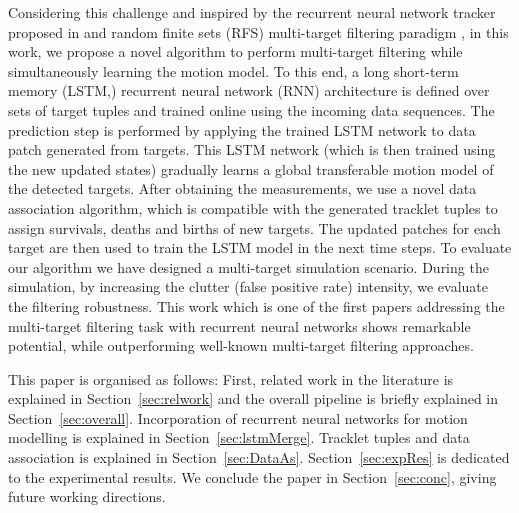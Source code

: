 \documentclass[runningheads]{llncs}
\begin{document}
Considering this challenge and inspired by the recurrent neural network tracker proposed in \cite{Milan:2017} and random finite sets (RFS) multi-target filtering paradigm \cite{Mahler:2003,Mahler:2007,Vo:2006}, in this work, we propose a novel algorithm to perform multi-target filtering while simultaneously learning the motion model. To this end, a long short-term memory (LSTM,{\cite{hochreiter1997}}) recurrent neural network (RNN) architecture is defined over sets of target tuples and trained {online} using the incoming data sequences. The prediction step is performed by applying the trained LSTM network to data patch generated from targets. This LSTM network (which is then trained using the new updated states) gradually learns a global transferable motion model of the detected targets.
After obtaining the measurements, we use a novel data association algorithm, which is compatible with the generated tracklet tuples to assign survivals, deaths and births of new targets. The updated patches for each target are then used to train the LSTM model in the next time steps.
To evaluate our algorithm we have designed a multi-target simulation scenario. During the simulation, by increasing the clutter (false positive rate) intensity, we evaluate the filtering robustness. 
This work which is one of the first papers addressing the multi-target filtering task with recurrent neural networks shows remarkable potential, while outperforming well-known multi-target filtering approaches.

This paper is organised as follows: First, related work in the literature is explained in Section~\ref{sec:relwork} and the overall pipeline is briefly explained in Section~\ref{sec:overall}. Incorporation of recurrent neural networks for motion modelling is explained in Section~\ref{sec:lstmMerge}. Tracklet tuples and data association is explained in Section~\ref{sec:DataAs}. Section~\ref{sec:expRes} is dedicated to the experimental results. We conclude the paper in Section~\ref{sec:conc}, giving future working directions.
\end{document}
